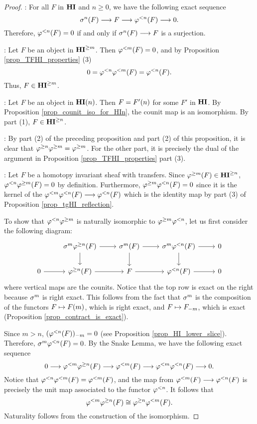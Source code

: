 \begin{proof}
 : For all $F$ in $\HI$ and $n \geq 0$, we have the 
following exact sequence
\[
\sgHI{n}(F) \to F \to \tlHI{n}(F) \to 0.
\]
Therefore, $\tlHI{n}(F) = 0$ if and only if $\sgHI{n}(F) 
\to F$ is a surjection.

 : Let $F$ be an object in $\THI{m}$. Then 
$\tlHI{m}(F) = 0$, and by Proposition \ref{prop_TFHI_properties} (3)
\[
0 = \tlHI{n}\tlHI{m}(F) = \tlHI{n}(F).
\]
Thus, $F \in \THI{m}$.

 : Let $F$ be an object in $\HI(n)$. Then $F = 
\LHI[n]{F'}$ for some $F'$ in $\HI$. By Proposition 
\ref{prop_counit_iso_for_HIn}, the counit map is an isomorphism. 
By part (1), $F \in \THI{n}$.

 : By part (2) of the preceding proposition and part 
(2) of this proposition, it is clear that $\tgHI{n} \tgHI{m} = 
\tgHI{m}$. For the other part, it is precisely the dual of the 
argument in Proposition \ref{prop_TFHI_properties} part (3).

 : Let $F$ be a homotopy invariant sheaf with 
transfers. Since $\tgHI{m}(F) \in \THI{n}$, $\tlHI{n} \tgHI{m}(F) 
= 0$ by definition. Furthermore, $\tgHI{m}\tlHI{n}(F) = 0$ since 
it is the kernel of the $\tlHI{m} \tlHI{n}(F) \to \tlHI{n}(F)$ 
which is the identity map by part (3) of Proposition
\ref{prop_tgHI_reflection}.

To show that $\tlHI{n} \tgHI{m}$ is naturally isomorphic to
$\tgHI{m} \tlHI{n}$, let us first consider the following 
diagram:
\[
\begin{tikzcd}
{} &
\sgHI{m} \tgHI{n}(F) \arrow{r} \arrow{d} &
\sgHI{m}(F) \arrow{r} \arrow{d} &
\sgHI{m} \tlHI{n}(F) \arrow{r} \arrow{d} &
0 \\
0 \arrow{r} &
\tgHI{n}(F) \arrow{r} &
F \arrow{r} &
\tlHI{n}(F) \arrow{r}&
0
\end{tikzcd}
\]
where vertical maps are the counits. Notice that the top row is 
exact on the right because $\sgHI{m}$ is right exact. This follows 
from the fact that $\sgHI{m}$ is the composition of the functors 
$F \mapsto \LHI[m]{F}$, which is right exact, and $F \mapsto 
\RHI[m]{F}$, which is exact (Proposition \ref{prop_contract_is_exact}).

Since $m > n$, $\RHI[m]{(\tlHI{n}(F))} = 0$ (see Proposition
\ref{prop_HI_lower_slice}). Therefore, $\sgHI{m}\tlHI{n}(F) = 0$. 
By the Snake Lemma, we have the following exact sequence
\[
0 \to \tlHI{m}\tgHI{n}(F) \to \tlHI{m}(F) \to \tlHI{m} \tlHI{n}(F) 
   \to 0.
\]
Notice that $\tlHI{n} \tlHI{m}(F) = \tlHI{m}(F)$, and the map from
$\tlHI{m}(F) \to \tlHI{n}(F)$ is precisely the unit map associated
to the functor $\tlHI{n}$. It follows that
\[
\tlHI{m} \tgHI{n}(F) \cong \tgHI{n} \tlHI{m}(F).
\]
Naturality follows from the construction of the isomorphism.
\end{proof}

